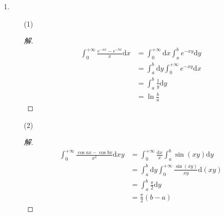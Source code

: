 \documentclass{article}
\begin{document}
\begin{enumerate}
\begin{proof}
\begin{enumerate}
            则有 \begin{equation}
                \begin{aligned}
                    G^{'}(y)
                    &=\int_{0}^{+\infty}e^{-x^2}\cos(2xy)2x\mathrm{d}x \\
                    &=\int_{0}^{+\infty}-\cos(2xy)\mathrm{d}e^{-x^2} \\
                    &=-\cos(2xy)e^{-x^2}\bigg|_{0}^{+\infty}-\int_{0}^{+\infty}e^{-x^2}\sin(2xy)2y\mathrm{d}x \\
                    &=1-2yG(y)
                \end{aligned}
                \nonumber
            \end{equation}
            又有 $G(0)=0$ , 解微分方程得 \begin{equation}
                G(y)=e^{-y^2}\int_{0}^{y}e^{-t^2}\mathrm{d}t
                \nonumber
            \end{equation}
        \end{enumerate}
    \end{proof}
    \item \begin{enumerate}
        \item[(1)] \begin{proof}[解]
            \begin{equation}
                \begin{aligned}
                    \int_{0}^{+\infty}\frac{e^{-ax}-e^{-bx}}{x}\mathrm{d}x
                    &=\int_{0}^{+\infty}\mathrm{d}x\int_{a}^{b}e^{-xy}\mathrm{d}y \\
                    &=\int_{a}^{b}\mathrm{d}y\int_{0}^{+\infty}e^{-xy}\mathrm{d}x \\
                    &=\int_{a}^{b}\frac{1}{y}\mathrm{d}y \\
                    &=\ln\frac{b}{a}
                \end{aligned}
                \nonumber
            \end{equation}
        \end{proof}
        \item[(2)] \begin{proof}[解]
            \begin{equation}
                \begin{aligned}
                    \int_{0}^{+\infty}\frac{\cos ax-\cos bx}{x^2}\mathrm{d}xy
                    &=\int_{0}^{+\infty}\frac{\mathrm{d}x}{x}\int_{a}^{b}\sin(xy)\mathrm{d}y \\
                    &=\int_{a}^{b}\mathrm{d}y\int_{0}^{+\infty}\frac{\sin(xy)}{xy}\mathrm{d}(xy) \\
                    &=\int_{a}^{b}\frac{\pi}{2}\mathrm{d}y \\
                    &=\frac{\pi}{2}(b-a)
                \end{aligned}
                \nonumber
            \end{equation}
        \end{proof}
    \end{enumerate}
\end{enumerate}
\end{document}

